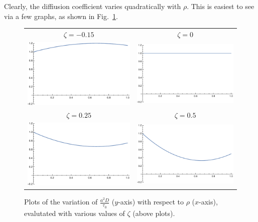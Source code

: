 Clearly, the diffiusion coefficient varies quadratically with $\rho$. This is easiest to see via a few graphs, as shown in Fig.~\ref{fig:analDiffCoeffs}.
\begin{figure}[h!]
\caption{\label{fig:analDiffCoeffs} Plots of the variation of $\frac{a^2 D}{\tau_0}$ ($y$-axis) with respect to $\rho$ ($x$-axis), evalutated with various values of $\zeta$ (above plots).}
\begin{center}
 \begin{tabular}{c c}
     $\zeta = -0.15$ & $\zeta = 0$ \\ 
     \includegraphics[width=0.49\linewidth]{analytics/images/diffCoeffs/diffCoeff-neg0-15}  & \includegraphics[width=0.49 \linewidth]{analytics/images/diffCoeffs/diffCoeff-0-0} \\
     $\zeta = 0.25$  & $\zeta = 0.5$ \\
     \includegraphics[width=0.49\linewidth]{analytics/images/diffCoeffs/diffCoeff-0-25}  & \includegraphics[width=0.49 \linewidth]{analytics/images/diffCoeffs/diffCoeff-0-5} \\

\end{tabular}
\end{center}
\end{figure}
